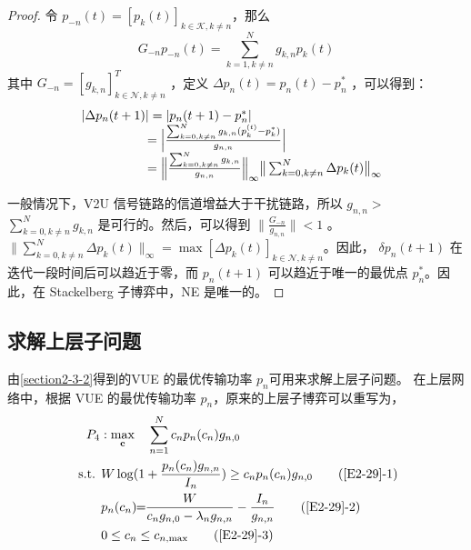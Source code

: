 \begin{proof}
令 $p_{-n}(t)=[p_k(t)]_{k\in\mathcal{K},k\neq n}$，那么
\begin{equation} \label{E2-27}
G_{-n}p_{-n}(t)=\sum\limits_{k=1,k\neq n}^N g_{k,n}p_k(t)
\end{equation}
其中 $G_{-n}=[g_{k,n}]_{k\in\mathcal{N},k\neq n}^T$ ，定义 $\Delta p_{n}(t)=p_{n}(t)-p_{n}^*$ ，可以得到：%
\begin{eqnarray}\label{E2-28}
\hspace{-0.2cm}
 \begin{array}{lll}
&\!\!\!\!\!\!\!|\Delta p_{n}(t+1)|=|p_{n}(t+1)-p_{n}^*|\\
&\quad \quad \quad \quad =\Big|\frac{\sum_{k=0,k\neq n}^N g_{k,n}(p_k^{(t)}-p_k^*)}{g_{n,n}}\Big|\\
&\quad \quad \quad \quad =\Big\|\frac{\sum_{k=0,k\neq n}^Ng_{k,n}}{g_{n,n}}\Big\|_\infty \big\|\sum_{k=0,k\neq n}^N\Delta p_{k}(t)\big\|_\infty
\end{array}
\end{eqnarray}

一般情况下，V2U 信号链路的信道增益大于干扰链路，所以 $g_{n,n}$$>$$\sum_{k=0,k\neq n}^N g_{k,n}$ 是可行的。然后，可以得到 $\|\frac{G_{-n}}{g_{n,n}}\|$$<$$1$ 。
$\big\|\sum_{k=0,k\neq n}^N\Delta p_{k}(t)\big\|_\infty=\max [\Delta p_{k}(t)]_{k\in\mathcal{N},k\neq n}$。因此，    %
$\delta p_{n}(t+1)$ 在迭代一段时间后可以趋近于零，而 $p_{n}(t+1)$ 可以趋近于唯一的最优点 $p_{n}^*$。因此，在 Stackelberg 子博弈中，NE 是唯一的。
\end{proof}
\subsection{求解上层子问题}\label{section2-3-3}
由\ref{section2-3-2}得到的VUE 的最优传输功率 $p_n$可用来求解上层子问题。
在上层网络中，根据 VUE 的最优传输功率 $p_n$，原来的上层子博弈可以重写为，
\begin{align}  \label{E2-29}
& \!\!\!\!\!\!\!P_4:\max\limits_{\mathbf{c}} \quad \sum\limits_{n=1}^N c_{n} p_n(c_{n}) g_{n,0}                    \\
\text { s.t. }
& W\log(1+\frac{p_{n}(c_{n}) g_{n,n}}{I_n}) \geq c_{n} p_n(c_{n}) g_{n,0}         \tag{\ref{E2-29}{-1}} \label{E2-29-1}\\  %
& p_n(c_{n})\!\!=\!\!\frac{W}{c_n g_{n,0}-\lambda_n g_{n,n}}-\frac{I_n}{g_{n,n}}  \tag{\ref{E2-29}{-2}} \label{E2-29-2}\\ %
& 0\leq c_n\leq c_{n,\textrm{max}}                                                \tag{\ref{E2-29}{-3}} \label{E2-29-3}
\end{align}

